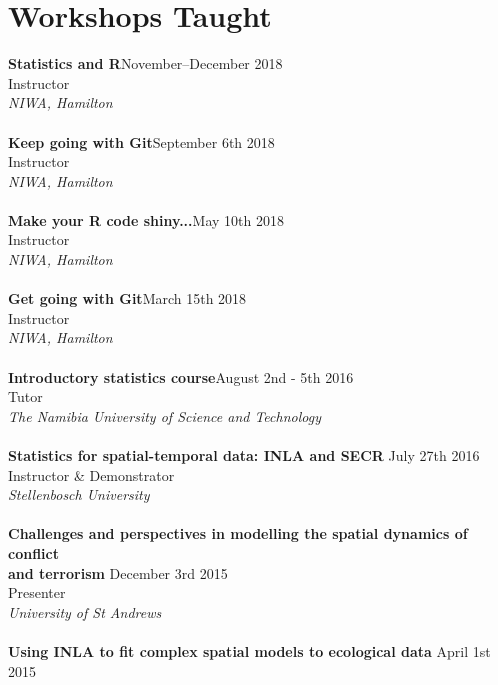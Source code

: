 \documentclass[10pt,letter]{article}
\begin{document}
\section*{Workshops Taught}
\vspace{1mm}
{\textbf{Statistics and R}}\hfill November--December 2018\\
Instructor \\
 {\sl NIWA, Hamilton}\\
 \hdashrule[0.5ex]{4cm}{1pt}{1pt}\\
{\textbf{Keep going with Git}}\hfill September 6th 2018\\
Instructor \\
 {\sl NIWA, Hamilton}\\
 \hdashrule[0.5ex]{4cm}{1pt}{1pt}\\
{\textbf{Make your R code shiny...}}\hfill May 10th 2018\\
Instructor \\
 {\sl NIWA, Hamilton}\\
 \hdashrule[0.5ex]{4cm}{1pt}{1pt}\\
{\textbf{Get going with Git}}\hfill March 15th 2018\\
Instructor \\
 {\sl NIWA, Hamilton}\\
 \hdashrule[0.5ex]{4cm}{1pt}{1pt}\\
{\textbf{Introductory statistics course}}\hfill August 2nd - 5th 2016\\
Tutor \\
 {\sl The Namibia University of Science and Technology }\\
 \hdashrule[0.5ex]{4cm}{1pt}{1pt}\\
 {\textbf{{Statistics for spatial-temporal data: INLA and SECR }}} \hfill July 27th 2016\\
 Instructor \& Demonstrator\\
 {\sl Stellenbosch University }\\
 \hdashrule[0.5ex]{4cm}{1pt}{1pt}\\
 {\textbf{{Challenges and perspectives in modelling the spatial dynamics of conflict\\ and terrorism }}} \hfill December 3rd 2015\\
 Presenter\\
 {\sl University of St Andrews}\\
 \hdashrule[0.5ex]{4cm}{1pt}{1pt}\\
{\textbf{{Using INLA to fit complex spatial models to ecological data }}} \hfill April 1st 2015\\
\end{document}
